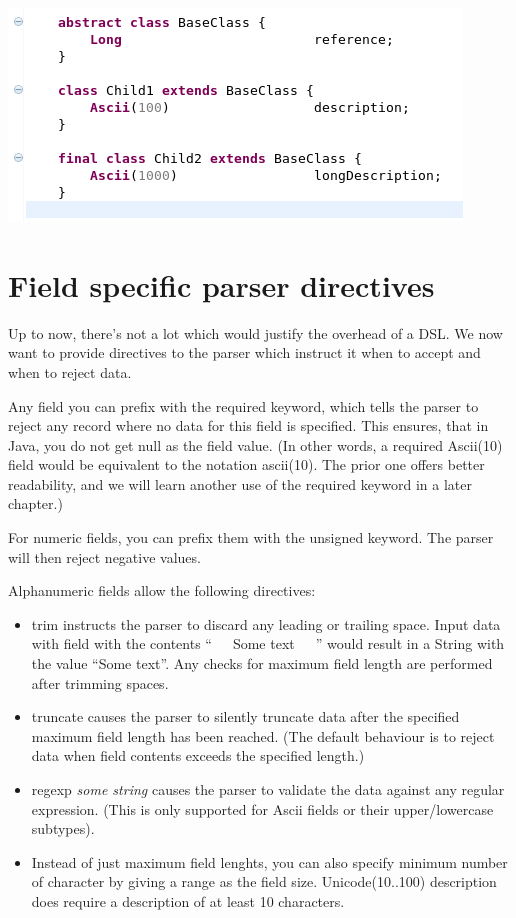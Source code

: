 \documentclass[11pt,a4paper,oneside]{article}
\begin{document}
\vspace{2mm}
\hspace{1cm}\includegraphics[scale=0.5]{images/tut1-007.png}


\section{Field specific parser directives}
Up to now, there's not a lot which would justify the overhead of a DSL.
We now want to provide directives to the parser which instruct it when to accept and when to reject data.

Any field you can prefix with the {\ttfamily required} keyword, which tells the parser to reject any record where no data for this field is specified.
This ensures, that in Java, you do not get {\ttfamily null} as the field value. (In other words, a {\ttfamily required
Ascii(10)} field would be equivalent to the notation {\ttfamily ascii(10)}.
The prior one offers better readability, and we will learn another use of the {\ttfamily required} keyword in a later chapter.)

For numeric fields, you can prefix them with the {\ttfamily unsigned} keyword. The parser will then reject negative values.

Alphanumeric fields allow the following directives:
\begin{itemize}
  \item {\ttfamily trim} instructs the parser to discard any leading or trailing space. Input data with field with the contents ``\ \ \ Some text\ \ \  '' would result in a String with the
  value ``Some text''. Any checks for maximum field length are performed after trimming spaces.
  \item {\ttfamily truncate} causes the parser to silently truncate data after the specified maximum field length has been reached.
   (The default behaviour is to reject data when field contents exceeds the specified length.)
   \item {\ttfamily regexp} {\it{some string}} causes the parser to validate the data against any regular expression. (This is only supported for
     {\ttfamily Ascii} fields or their upper/lowercase subtypes).
   \item Instead of just maximum field lenghts, you can also specify minimum number of character by giving a range as the field size.
    {\ttfamily Unicode(10..100) description} does require a description of at least 10 characters.
\end{itemize}
\end{document}
